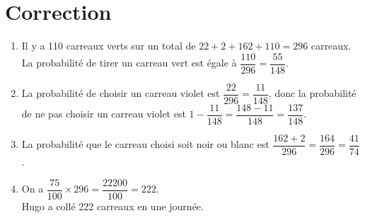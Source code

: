 \documentclass[12pt]{article}
\begin{document}
\newpage

\section*{Correction}

\begin{enumerate}
    \item Il y a 110 carreaux verts sur un total de $22 + 2 + 162 + 110 = 296$ carreaux. \\
    La probabilité de tirer un carreau vert est égale à $\dfrac{110}{296} = \dfrac{55}{148}$.
    \item La probabilité de choisir un carreau violet est $\dfrac{22}{296} = \dfrac{11}{148}$, donc la probabilité de ne pas choisir un carreau violet est $1 - \dfrac{11}{148} = \dfrac{148 - 11}{148} = \dfrac{137}{148}$.
    \item La probabilité que le carreau choisi soit noir ou blanc est $\dfrac{162 + 2}{296} = \dfrac{164}{296} = \dfrac{41}{74}$.
    \item On a $\dfrac{75}{100} \times 296 = \dfrac{22200}{100} = 222$. \\
    Hugo a collé 222 carreaux en une journée.
\end{enumerate}
\end{document}
